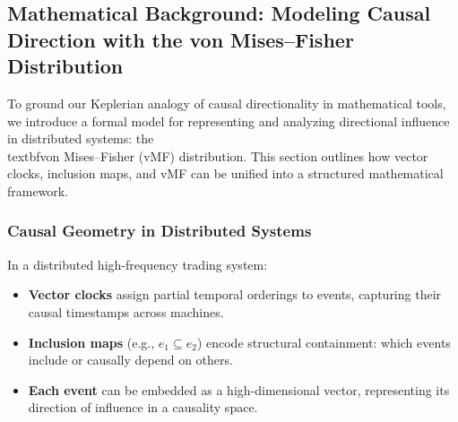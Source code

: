 \begin{center}
\end{center}




\subsection{Mathematical Background: Modeling Causal Direction with the von Mises--Fisher Distribution}

To ground our Keplerian analogy of causal directionality in mathematical tools, we introduce a formal model for representing and analyzing directional influence in distributed systems: the \\textbf{von Mises--Fisher (vMF) distribution}. This section outlines how vector clocks, inclusion maps, and vMF can be unified into a structured mathematical framework.

\subsubsection{Causal Geometry in Distributed Systems}
In a distributed high-frequency trading system:
\begin{itemize}
  \item \textbf{Vector clocks} assign partial temporal orderings to events, capturing their causal timestamps across machines.
  \item \textbf{Inclusion maps} (e.g., $e_1 \subseteq e_2$) encode structural containment: which events include or causally depend on others.
  \item \textbf{Each event} can be embedded as a high-dimensional vector, representing its direction of influence in a causality space.
\end{itemize}

